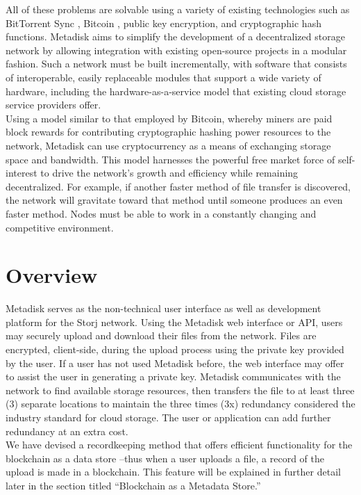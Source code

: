 \documentclass[a4paper,10pt]{article}
\begin{document}
All of these problems are solvable using a variety of existing technologies such as BitTorrent Sync \cite{3}, Bitcoin \cite{4}, public key encryption, and cryptographic hash functions.  Metadisk aims to simplify the development of a decentralized storage network by allowing integration with existing open-source projects in a modular fashion.  Such a network must be built incrementally, with software that consists of interoperable, easily replaceable modules that support a wide variety of hardware, including the hardware-as-a-service model that existing cloud storage service providers offer. \\

Using a model similar to that employed by Bitcoin, whereby miners are paid block rewards for contributing cryptographic hashing power resources to the network, Metadisk can use  cryptocurrency as a means of exchanging storage space and bandwidth. This model harnesses the powerful free market force of self-interest to drive the network’s growth and efficiency while remaining decentralized.  For example, if another faster method of file transfer is discovered, the network will gravitate toward that method until someone produces an even faster method. Nodes must be able to work in a constantly changing and competitive environment.  


\section*{Overview}

Metadisk serves as the non-technical user interface as well as development platform for the Storj network. Using the Metadisk web interface or API, users may securely upload and download their files from the network. Files are encrypted, client-side, during the upload process using the private key provided by the user.  If a user has not used Metadisk before, the web interface may offer to assist the user in generating a private key. Metadisk communicates with the network to find available storage resources, then transfers the file to at least three (3) separate locations to maintain the three times (3x) redundancy considered the industry standard for cloud storage. The user or application can add further redundancy at an extra cost. \\

We have devised a recordkeeping method that offers efficient functionality for the blockchain as a data store --thus when a user uploads a file, a record of the upload is made in a blockchain. This feature will be explained in further detail later in the section titled “Blockchain as a Metadata Store.”\\
\end{document}
